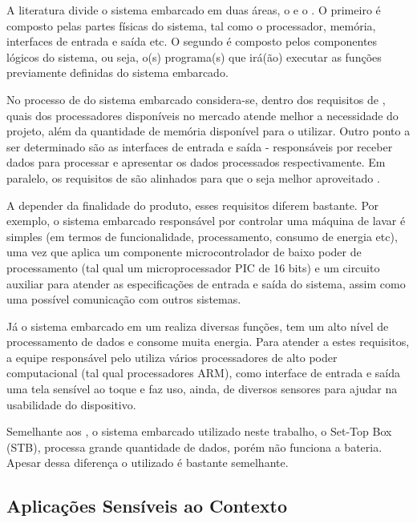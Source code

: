 A literatura divide o sistema embarcado em duas áreas, o \hardware[] e o 
\software. O primeiro é composto pelas partes físicas do sistema, 
tal como o processador, memória, interfaces de entrada e saída etc. O segundo é
composto pelos componentes lógicos do sistema, ou seja, o(s) programa(s) que 
irá(ão) executar as funções previamente definidas do sistema embarcado.

No processo de \design[] do sistema embarcado considera-se, dentro dos
requisitos de \hardware, quais dos processadores disponíveis no mercado atende
melhor a necessidade do projeto, além da quantidade de memória disponível para o
\software[] utilizar. Outro ponto a ser determinado são as interfaces de entrada
e saída - responsáveis por receber dados para processar e apresentar os dados
processados respectivamente. Em paralelo, os requisitos de \software[] são
alinhados para que o \hardware[] seja melhor aproveitado
\cite{wolf2012computers}.

A depender da finalidade do produto, esses requisitos diferem bastante. Por
exemplo, o sistema embarcado responsável por controlar uma máquina de lavar é
simples (em termos de funcionalidade, processamento, consumo de energia etc),
uma vez que aplica um componente microcontrolador de baixo poder de
processamento (tal qual um microprocessador PIC de 16 bits) e um circuito
auxiliar para atender as especificações de entrada e saída do sistema, assim
como uma possível comunicação com outros sistemas.

Já o sistema embarcado em um \smartphone[] realiza diversas funções, tem um
alto nível de processamento de dados e consome muita energia. Para atender a
estes requisitos, a equipe responsável pelo \design[] utiliza vários
processadores de alto poder computacional (tal qual processadores ARM), como
interface de entrada e saída uma tela sensível ao toque e faz uso, ainda, de
diversos sensores para ajudar na usabilidade do dispositivo.

Semelhante aos \smartphones, o sistema embarcado utilizado neste trabalho, o
Set-Top Box (STB), processa grande quantidade de dados, porém não funciona a
bateria. Apesar dessa diferença o \hardware[] utilizado é bastante semelhante.




\subsection{Aplicações Sensíveis ao Contexto}\label{subsec:contexto}




























